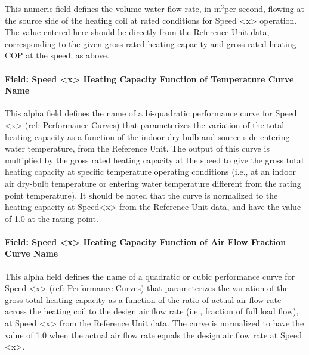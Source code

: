 This numeric field defines the volume water flow rate, in m\(^{3}\)per second, flowing at the source side of the heating coil at rated conditions for Speed \textless{}x\textgreater{} operation. The value entered here should be directly from the Reference Unit data, corresponding to the given gross rated heating capacity and gross rated heating COP at the speed, as above.

\paragraph{Field: Speed \textless{}x\textgreater{} Heating Capacity Function of Temperature Curve Name}\label{field-speed-x-heating-capacity-function-of-temperature-curve-name-2}

This alpha field defines the name of a bi-quadratic performance curve for Speed \textless{}x\textgreater{} (ref: Performance Curves) that parameterizes the variation of the total heating capacity as a function of the indoor dry-bulb and source side entering water temperature, from the Reference Unit. The output of this curve is multiplied by the gross rated heating capacity at the speed to give the gross total heating capacity at specific temperature operating conditions (i.e., at an indoor air dry-bulb temperature or entering water temperature different from the rating point temperature). It should be noted that the curve is normalized to the heating capacity at Speed\textless{}x\textgreater{} from the Reference Unit data, and have the value of 1.0 at the rating point.

\paragraph{Field: Speed \textless{}x\textgreater{} Heating Capacity Function of Air Flow Fraction Curve Name}\label{field-speed-x-heating-capacity-function-of-air-flow-fraction-curve-name-1}

This alpha field defines the name of a quadratic or cubic performance curve for Speed \textless{}x\textgreater{} (ref: Performance Curves) that parameterizes the variation of the gross total heating capacity as a function of the ratio of actual air flow rate across the heating coil to the design air flow rate (i.e., fraction of full load flow), at Speed \textless{}x\textgreater{} from the Reference Unit data. The curve is normalized to have the value of 1.0 when the actual air flow rate equals the design air flow rate at Speed \textless{}x\textgreater{}.

